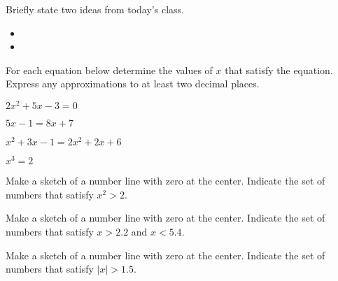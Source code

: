 \begin{problem}
\item Briefly state two ideas from today's class.
  \begin{itemize}
  \item 
  \item 
  \end{itemize}
\item For each equation below determine the values of $x$ that satisfy
  the equation. Express any approximations to at least two decimal
  places.
  \begin{subproblem}
    \item $2x^2 + 5x - 3 = 0$
    \item $5x-1=8x+7$
    \item $x^2 + 3x - 1 = 2x^2 + 2x + 6$
    \item $x^3 = 2$
  \end{subproblem}
\item Make a sketch of a number line with zero at the center.
  Indicate the set of numbers that satisfy $x^2>2$.
\item Make a sketch of a number line with zero at the center.
  Indicate the set of numbers that satisfy $x>2.2$ and $x<5.4$.
\item Make a sketch of a number line with zero at the center.
  Indicate the set of numbers that satisfy $|x|>1.5$.
\end{problem}

